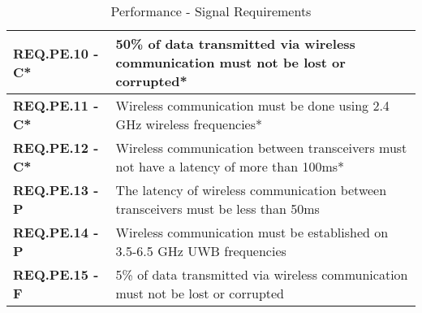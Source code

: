 \bgroup
\def\arraystretch{1.5}
\begin{table}[H]
\centering
\begin{tabular}{ | m{3.5cm} | m{12.5cm} |}
\hline
 \textbf{REQ.PE.10 - C*} & 50\% of data transmitted via wireless communication must not be lost or corrupted* \\
\hline
 \textbf{REQ.PE.11 - C*} & Wireless communication must be done using 2.4 GHz wireless frequencies* \\
\hline
 \textbf{REQ.PE.12 - C*} & Wireless communication between transceivers must not have a latency of more than 100ms* \\
\hline
 \textbf{REQ.PE.13 - P} & The latency of wireless communication between transceivers must be less than 50ms \\
\hline
 \textbf{REQ.PE.14 - P} & Wireless communication must be established on 3.5-6.5 GHz UWB frequencies \\
\hline
 \textbf{REQ.PE.15 - F} & 5\% of data transmitted via wireless communication must not be lost or corrupted \\

\hline
\end{tabular}
\caption{Performance - Signal Requirements }
\end{table}

